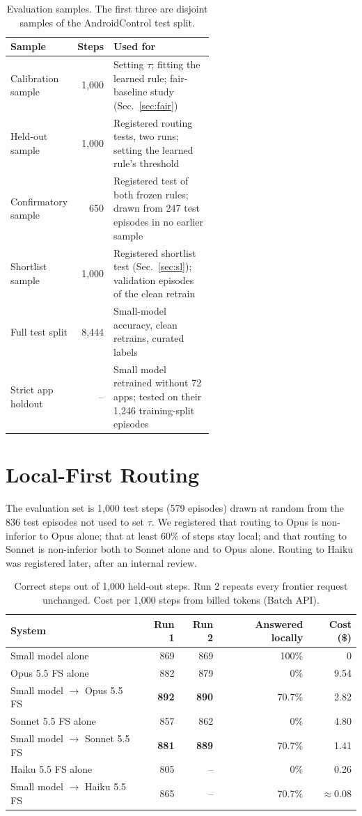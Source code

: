 \documentclass[10pt]{article}
\begin{document}
\begin{table}[t]\centering\small
\caption{Evaluation samples. The first three are disjoint samples of the AndroidControl test split.}\label{tab:design}
\begin{tabular}{lrp{0.58\linewidth}}\toprule
Sample & Steps & Used for\\\midrule
Calibration sample & 1{,}000 & Setting $\tau$; fitting the learned rule; fair-baseline study (Sec.~\ref{sec:fair})\\
Held-out sample & 1{,}000 & Registered routing tests, two runs; setting the learned rule's threshold\\
Confirmatory sample & 650 & Registered test of both frozen rules; drawn from 247 test episodes in no earlier sample\\
Shortlist sample & 1{,}000 & Registered shortlist test (Sec.~\ref{sec:sl}); validation episodes of the clean retrain\\
Full test split & 8{,}444 & Small-model accuracy, clean retrains, curated labels\\
Strict app holdout & -- & Small model retrained without 72 apps; tested on their 1{,}246 training-split episodes\\\bottomrule
\end{tabular}\end{table}

\section{Local-First Routing}\label{sec:router}
The evaluation set is 1{,}000 test steps (579 episodes) drawn at random from the 836 test episodes not used to set $\tau$. We registered that routing to Opus is non-inferior to Opus alone; that at least 60\% of steps stay local; and that routing to Sonnet is non-inferior both to Sonnet alone and to Opus alone. Routing to Haiku was registered later, after an internal review.

\begin{table}[t]\centering\small
\caption{Correct steps out of 1{,}000 held-out steps. Run 2 repeats every frontier request unchanged. Cost per 1{,}000 steps from billed tokens (Batch API).}\label{tab:router}
\begin{tabular}{lrrrr}\toprule
System & Run 1 & Run 2 & Answered locally & Cost (\$)\\\midrule
Small model alone & 869 & 869 & 100\% & 0\\\midrule
Opus 5.5 FS alone & 882 & 879 & 0\% & 9.54\\
Small model $\rightarrow$ Opus 5.5 FS & \textbf{892} & \textbf{890} & 70.7\% & 2.82\\\midrule
Sonnet 5.5 FS alone & 857 & 862 & 0\% & 4.80\\
Small model $\rightarrow$ Sonnet 5.5 FS & \textbf{881} & \textbf{889} & 70.7\% & 1.41\\\midrule
Haiku 5.5 FS alone & 805 & -- & 0\% & 0.26\\
Small model $\rightarrow$ Haiku 5.5 FS & 865 & -- & 70.7\% & $\approx$0.08\\\bottomrule
\end{tabular}\end{table}
\end{document}
